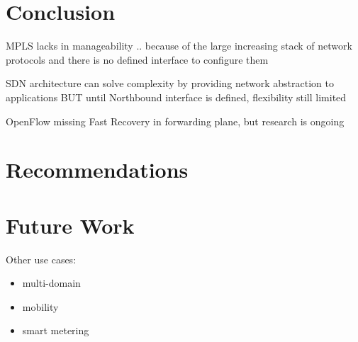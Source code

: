 \section{Conclusion} %
\label{sec:conclusion}


MPLS lacks in manageability .. because of the large increasing stack of network protocols and there is no defined interface to configure them

SDN architecture can solve complexity by providing network abstraction to applications
BUT until Northbound interface is defined, flexibility still limited

OpenFlow missing Fast Recovery in forwarding plane, but research is ongoing


\section{Recommendations} %
\label{sec:recommendations}





\section{Future Work} %
\label{sec:future_work}

Other use cases:
\begin{itemize}
	\item multi-domain
	\item mobility
	\item smart metering
\end{itemize}


